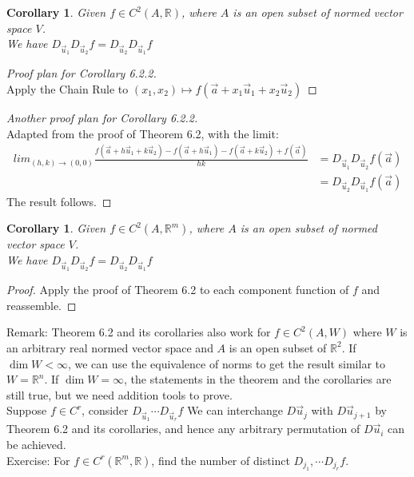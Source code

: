 \documentclass[15pt]{book}
\theoremstyle{break}
\theoremstyle{break}
\newtheorem{corT}[lem]{Corollary}
\newcommand{\R}{\mathbb{R}}
\newcommand{\remark}{\color{blue}Remark: \color{black}}
\newcommand{\exercise}{\color{green}Exercise: \color{black}}
\begin{document}
\begin{corT}
Given $f\in C^2(A,\R)$, where $A$ is an open subset of normed vector space $V$.\\ We have $D_{\vec{u}_1}D_{\vec{u}_2}f = D_{\vec{u}_2}D_{\vec{u}_1}f$
\end{corT}
\begin{proof}[Proof plan for Corollary 6.2.2]
${}$\\Apply the Chain Rule to $(x_1,x_2) \mapsto f(\vec{a}+x_1\vec{u}_1+x_2\vec{u}_2)$
\end{proof}
\begin{proof}[Another proof plan for Corollary 6.2.2]
${}$\\Adapted from the proof of Theorem 6.2, with the limit: \begin{align*}
lim_{(h,k)\to (0,0)}\frac{f(\vec{a}+h\vec{u}_1+k\vec{u}_2)-f(\vec{a}+h\vec{u}_1)-f(\vec{a}+k\vec{u}_2)+f(\vec{a})}{hk} 
&=D_{\vec{u}_1}D_{\vec{u}_2}f(\vec{a}) \\
&=D_{\vec{u}_2}D_{\vec{u}_1}f(\vec{a})
\end{align*}
The result follows.
\end{proof}

\begin{corT}
Given $f\in C^2(A,\R^m)$, where $A$ is an open subset of normed vector space $V$.\\ We have $D_{\vec{u}_1}D_{\vec{u}_2}f = D_{\vec{u}_2}D_{\vec{u}_1}f$
\end{corT}
\begin{proof}
Apply the proof of Theorem 6.2 to each component function of $f$ and reassemble.
\end{proof}
\remark Theorem 6.2 and its corollaries also work for $f \in C^2(A,W)$ where $W$ is an arbitrary real normed vector space and $A$ is an open subset of $\R^2$. If $\dim W <\infty$, we can use the equivalence of norms to get the result similar to $W = \R^n$. If $\dim W = \infty$, the statements in the theorem and the corollaries are still true, but we need addition tools to prove.\\

Suppose $f\in C^r$, consider $D_{\vec{u}_1}\cdots D_{\vec{u}_r}f$
We can interchange $D\vec{u}_j$ with $D\vec{u}_{j+1}$ by Theorem 6.2 and its corollaries, and hence any arbitrary permutation of $D\vec{u}_i$ can be achieved. \\

\exercise For $f \in C^r(\R^m,\R)$, find the number of distinct $D_{j_1},\cdots D_{j_r} f$.\\
\end{document}
